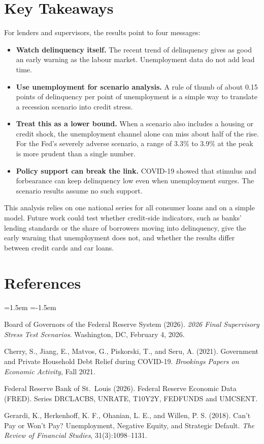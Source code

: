 \documentclass[11pt]{article}
\begin{document}
\section*{Key Takeaways}

For lenders and supervisors, the results point to four messages:
\begin{itemize}
\item \textbf{Watch delinquency itself.} The recent trend of delinquency gives as good an early warning as the labour market. Unemployment data do not add lead time.
\item \textbf{Use unemployment for scenario analysis.} A rule of thumb of about 0.15 points of delinquency per point of unemployment is a simple way to translate a recession scenario into credit stress.
\item \textbf{Treat this as a lower bound.} When a scenario also includes a housing or credit shock, the unemployment channel alone can miss about half of the rise. For the Fed's severely adverse scenario, a range of 3.3\% to 3.9\% at the peak is more prudent than a single number.
\item \textbf{Policy support can break the link.} COVID-19 showed that stimulus and forbearance can keep delinquency low even when unemployment surges. The scenario results assume no such support.
\end{itemize}

This analysis relies on one national series for all consumer loans and on a simple model. Future work could test whether credit-side indicators, such as banks' lending standards or the share of borrowers moving into delinquency, give the early warning that unemployment does not, and whether the results differ between credit cards and car loans.

\section*{References}
\begin{list}{}{\leftmargin=1.5em \itemindent=-1.5em \itemsep=3pt}
\item Board of Governors of the Federal Reserve System (2026). \emph{2026 Final Supervisory Stress Test Scenarios}. Washington, DC, February 4, 2026.
\item Cherry, S., Jiang, E., Matvos, G., Piskorski, T., and Seru, A. (2021). Government and Private Household Debt Relief during COVID-19. \emph{Brookings Papers on Economic Activity}, Fall 2021.
\item Federal Reserve Bank of St.\ Louis (2026). Federal Reserve Economic Data (FRED). Series DRCLACBS, UNRATE, T10Y2Y, FEDFUNDS and UMCSENT.
\item Gerardi, K., Herkenhoff, K. F., Ohanian, L. E., and Willen, P. S. (2018). Can't Pay or Won't Pay? Unemployment, Negative Equity, and Strategic Default. \emph{The Review of Financial Studies}, 31(3):1098--1131.
\end{list}
\end{document}
